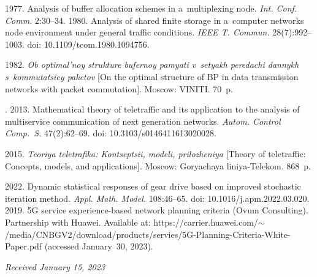 \begin{multicols}{2}
{{\begin{thebibliography}{99}
 1977. Analysis of buffer allocation schemes in a~multiplexing node. \textit{Int. Conf. Comm.} 2:30--34.
 1980. Analysis of shared finite storage in a~computer networks node environment under general traffic conditions. 
 \textit{IEEE T. Commun.} 28(7):992--1003. doi: 10.1109/tcom.1980.1094756.
 
 1982. \textit{Ob op\-ti\-mal'\-noy struk\-tu\-re bu\-fer\-noy pa\-mya\-ti v~se\-tyakh pe\-re\-da\-chi dan\-nykh 
 s~kom\-mu\-ta\-tsi\-ey pa\-ke\-tov} [On the optimal structure of BP in data transmission networks with packet commutation]. Moscow: VINITI. 70~p.
 
.
 2013. Mathematical theory of teletraffic and its application to the analysis of multiservice communication of next generation networks. 
 \textit{Autom. Control Comp.~S.} 47(2):62--69. doi: 10.3103/s0146411613020028.

 2015. \textit{Teo\-riya te\-le\-tra\-fi\-ka: Kon\-tsep\-tsii, mo\-de\-li, pri\-lo\-zhe\-niya} 
[Theory of teletraffic: Concepts, models, and applications]. Moscow: Goryachaya liniya-Telekom. 868~p.

2022. Dynamic statistical responses of gear drive based on improved stochastic iteration method. \textit{Appl. Math. Model.} 108:46--65.
doi: 10.1016/j.apm.2022.03.020.
 2019. 
5G service experience-based network planning criteria  (Ovum Consulting). Partnership with Huawei. Available at: 
{\sf https://carrier.huawei.com/$\sim$/media/\linebreak CNBGV2/download/products/servies/5G-Planning-Criteria-White-Paper.pdf} (accessed January~30, 2023).
  \end{thebibliography}

 }
 }

\end{multicols}

\vspace*{-6pt}

\hfill{\small\textit{Received January 15, 2023}}

\vspace*{-14pt}

